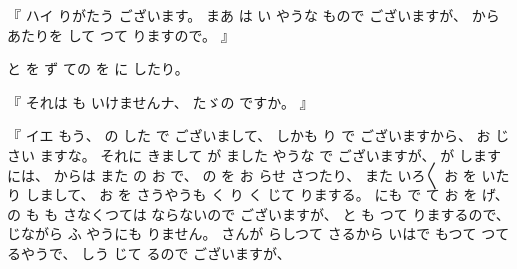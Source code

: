 %
『
ハイ
りがたう
ございます。
%
まあ
は
い
やうな
もので
ございますが、
%
から
あたりを
して
つて
りますので。
』

%
と
を
ず
ての
を
に
したり。

%
『
それは
も
いけませんナ、
%
たゞの%
ですか。
』

%
『
イエ
もう、
%
の
した
で
ございまして、
%
しかも
り
で
ございますから、
%
お
じ
さい
ますな。
%
それに
きまして
が
ました
やうな
で
ございますが、
%
が%
しますには、
%
からは
また
の
お
で、
%
の
を
お
らせ
さつたり、
%
また
いろ〳〵
お
を
いたり%
しまして、
%
お
を
%
さうやうも
く
り
く
じて
りまする。
%
にも
で
て
お
を
げ、
%
の
も
も
さなくつては
ならないので
ございますが、
%
と%
も
つて
りまするので、
%
じながら
ふ
やうにも
りません。
%
さんが
らしつて
さるから
いはで
もつて
つて
るやうで、
%
しう
じて
るので
ございますが、
